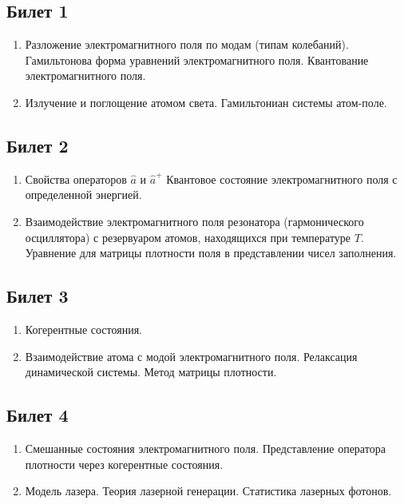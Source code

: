 


\Russian


\subsection*{Билет 1} 
\begin{enumerate}
\item Разложение электромагнитного поля по модам (типам колебаний).
Гамильтонова форма уравнений электромагнитного поля.
Квантование электромагнитного поля. 
\item Излучение и поглощение атомом света.
Гамильтониан системы атом-поле.
\end{enumerate}

\subsection*{Билет 2} 
\begin{enumerate}
\item Свойства операторов $ \hat a $ и $ \hat a ^+ $ 
Квантовое состояние электромагнитного поля  с определенной
  энергией. 
\item Взаимодействие электромагнитного поля резонатора
(гармонического осциллятора) с резервуаром атомов, находящихся при
температуре $T$.
Уравнение для матрицы плотности поля в представлении чисел
заполнения.
\end{enumerate}

\subsection*{Билет 3} 
\begin{enumerate}
\item Когерентные состояния. 
\item Взаимодействие атома с модой электромагнитного поля.
Релаксация динамической системы. Метод матрицы плотности.
\end{enumerate}

\subsection*{Билет 4} 
\begin{enumerate}
\item Смешанные состояния электромагнитного поля.
Представление оператора плотности через когерентные
состояния. 
\item Модель лазера. Теория лазерной генерации. Статистика лазерных
фотонов. 
\end{enumerate}


